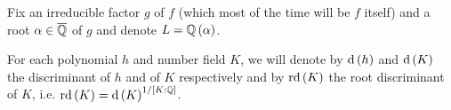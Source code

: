 \documentclass[../main.tex]{subfiles}
\begin{document}
Fix an irreducible factor $g$ of $f$ (which most of the time will be $f$ itself) and a root $\alpha \in \overline{\mathbb{Q}}$ of $g$ and denote $L = \mathbb{Q}\left( \alpha \right)$.

For each polynomial $h$ and number field $K$, we will denote by $\operatorname{\rm d}\left( h \right)$ and $\operatorname{\rm d}\left( K \right)$  the discriminant of $h$ and of $K$ respectively and by $\operatorname{\rm rd}\left( K \right)$ the root discriminant of $K$, i.e. $\operatorname{\rm rd}\left( K \right) = \operatorname{\rm d}\left( K \right)^{1/\left[ K : \mathbb{Q} \right]}$.  

  
\end{document}
